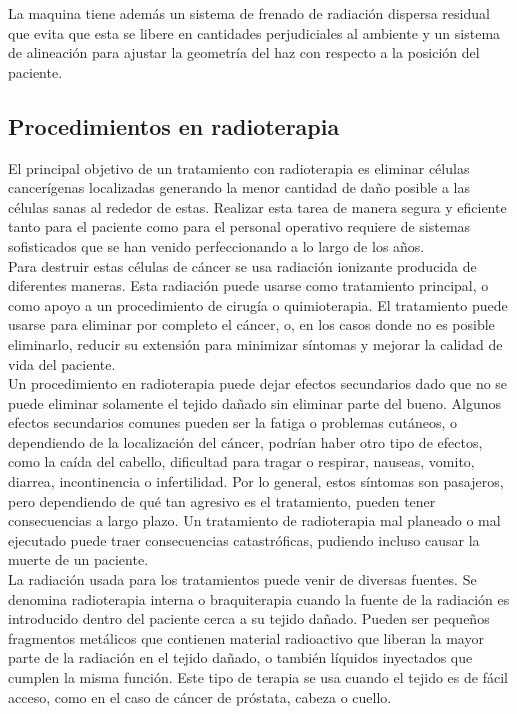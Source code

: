 La maquina tiene además un sistema de frenado de radiación dispersa residual que evita que esta se libere en cantidades perjudiciales al ambiente y un sistema de alineación para ajustar la geometría del haz con respecto a la posición del paciente.\\



\subsection{Procedimientos en radioterapia}

El principal objetivo de un tratamiento con radioterapia es eliminar células cancerígenas localizadas generando la menor cantidad de daño posible a las células sanas al rededor de estas. Realizar esta tarea de manera segura y eficiente tanto para el paciente como para el personal operativo requiere de sistemas sofisticados que se han venido perfeccionando a lo largo de los años\cite{radioterapia}\cite{cancer.net_2020}.\\

Para destruir estas células de cáncer se usa radiación ionizante producida de diferentes maneras. Esta radiación puede usarse como tratamiento principal, o como apoyo a un procedimiento de cirugía o quimioterapia. El tratamiento puede usarse para eliminar por completo el cáncer, o, en los casos donde no es posible eliminarlo, reducir su extensión para minimizar síntomas y mejorar la calidad de vida del paciente.\\

Un procedimiento en radioterapia puede dejar efectos secundarios dado que no se puede eliminar solamente el tejido dañado sin eliminar parte del bueno. Algunos efectos secundarios comunes pueden ser la fatiga o problemas cutáneos, o dependiendo de la localización del cáncer, podrían haber otro tipo de efectos, como la caída del cabello, dificultad para tragar o respirar, nauseas, vomito, diarrea, incontinencia o infertilidad. Por lo general, estos síntomas son pasajeros, pero dependiendo de qué tan agresivo es el tratamiento, pueden tener consecuencias a largo plazo. Un tratamiento de radioterapia mal planeado o mal ejecutado puede traer consecuencias catastróficas, pudiendo incluso causar la muerte de un paciente.\\

La radiación usada para los tratamientos puede venir de diversas fuentes. Se denomina radioterapia interna o braquiterapia cuando la fuente de la radiación es introducido dentro del paciente cerca a su tejido dañado. Pueden ser pequeños fragmentos metálicos que contienen material radioactivo que liberan la mayor parte de la radiación en el tejido dañado, o también líquidos inyectados que cumplen la misma función. Este tipo de terapia se usa cuando el tejido es de fácil acceso, como en el caso de cáncer de próstata, cabeza o cuello.\\

